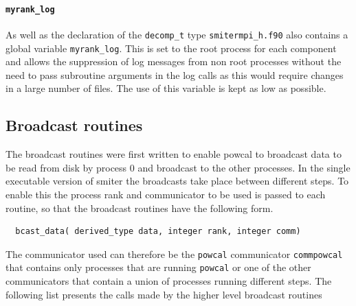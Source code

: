 \paragraph{\tt myrank\_log}
As well as the declaration of the {\tt decomp\_t} type {\tt smitermpi\_h.f90} also contains a global variable {\tt myrank\_log}. This is set to the root process for each component and allows the suppression of log messages from non root processes without the need to pass subroutine arguments in the log calls as this would require changes in a large number of files. The use of this variable is kept as low as possible.

\subsection{Broadcast routines}
The broadcast routines were first written to enable powcal to broadcast data to be read from disk by process 0 and broadcast to the other processes. In the single executable version of smiter the broadcasts take place between different steps. To enable this the process rank and communicator to be used is passed to each routine, so that the broadcast routines have the following form. 

\begin{lstlisting}
  bcast_data( derived_type data, integer rank, integer comm)
\end{lstlisting}

The communicator used can therefore be the {\tt powcal} communicator {\tt commpowcal} that contains only processes that are running {\tt powcal} or one of the other communicators that contain a union of processes running different steps. The following list presents the calls made by the higher level broadcast routines

